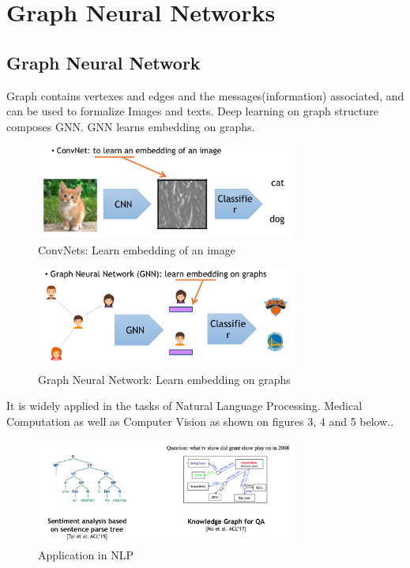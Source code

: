 \chapter{Graph Neural Networks}

\section{Graph Neural Network}
Graph contains vertexes and edges and the messages(information) associated, and can be used to formalize Images and texts. Deep learning on graph structure composes GNN. GNN learns embedding on graphs. 

\begin{figure}[ht]
\begin{center}
  \includegraphics[width=3.38in]{figs/Embedding_ConvNet.png}
\end{center}
   \caption{ConvNets: Learn embedding of an image}
\label{fig:CV}
\end{figure}

\begin{figure}[ht]
\begin{center}
  \includegraphics[width=3.38in]{figs/Embedding_Graph.png}
\end{center}
   \caption{Graph Neural Network: Learn embedding on graphs}
\label{fig:CV}
\end{figure}

It is widely applied in the tasks of Natural Language Processing. Medical Computation as well as Computer Vision as shown on figures 3, 4 and 5 below.. 
\begin{figure}[ht]
\begin{center}
  \includegraphics[width=3.38in]{figs/NLP.png}
\end{center}
   \caption{Application in NLP}
\label{fig:CV}
\end{figure}

